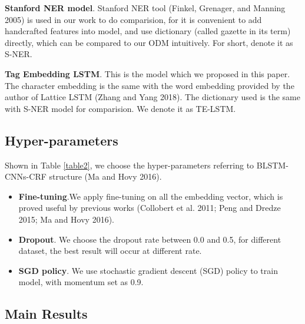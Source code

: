 \documentclass[letterpaper]{article} %
\begin{document}
\textbf{Stanford NER model}. Stanford NER tool (Finkel, Grenager, and Manning 2005) is used in our work to do comparision, for it is convenient to add handcrafted features into model, and use dictionary (called gazette in its term) directly, which can be compared to our ODM intuitively. For short, denote it as S-NER. 

\textbf{Tag Embedding LSTM}. This is the model which we proposed in this paper. The character embedding is the same with the word embedding provided by the author of Lattice LSTM (Zhang and Yang 2018). The dictionary used is the same with S-NER model for comparision. We denote it as TE-LSTM.

\subsection{Hyper-parameters}

Shown in Table \ref{table2}, we choose the hyper-parameters referring to BLSTM-CNNs-CRF structure (Ma and Hovy 2016). 

\begin{itemize}
\item \textbf{Fine-tuning}.We apply fine-tuning on all the embedding vector, which is proved useful by previous works (Collobert et al. 2011; Peng and Dredze 2015; Ma and Hovy 2016). 
\item \textbf{Dropout}. We choose the dropout rate between 0.0 and 0.5, for different dataset, the best result will occur at different rate.
\item \textbf{SGD policy}. We use stochastic gradient descent (SGD) policy to train model, with momentum set as 0.9.
\end{itemize}

\subsection{Main Results}

\begin{table}[t]
\caption{Main Results on MSRA.}\smallskip
\centering
{}
\label{table_msra}
\end{table}
\end{document}
